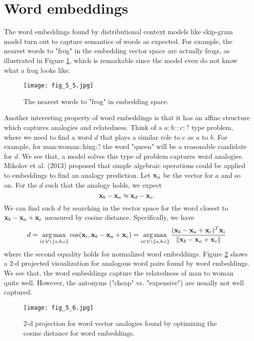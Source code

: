 \documentclass[../book-template.tex]{subfiles}
\begin{document}
\section{Word embeddings}
The word embeddings found by distributional context models like skip-gram model turn out to capture semantics of words as expected. For example, the nearest words to "frog" in the embedding vector space are actually frogs, as illustrated in Figure \ref{fig_5_5}, which is remarkable since the model even do not know what a frog looks like.
\begin{figure}[h] 
	\centering 
	\texttt{[image: fig\_5\_5.jpg]} 
	\caption{The nearest words to "frog" in embedding space.}\label{fig_5_5}
\end{figure}
\par Another interesting property of word embeddings is that it has an affine structure which captures analogies and relatedness. Think of a $a:b::c:?$ type problem, where we need to find a word $d$ that plays a similar role to $c$ as $a$ to $b$. For example, for man:woman::king:? the word "queen" will be a reasonable candidate for $d$. We see that, a model solves this type of problem captures word analogies. Mikolov et al. (2013) proposed that simple algebraic operations could be applied to embeddings to find an analogy prediction. Let ${\bf x}_a$ be the vector for $a$ and so on. For the $d$ such that the analogy holds, we expect
\begin{equation*}
	{\bf x}_b - {\bf x}_a \approx {\bf x}_d-{\bf x}_c.
\end{equation*}
We can find such $d$ by searching in the vector space for the word closest to ${\bf x}_b-{\bf x}_a+{\bf x}_c$ measured by cosine distance. Specifically, we have
\begin{equation*}
	d= \mathop{\arg\max}_{i\in \mathcal{V}\backslash\{a,b,c\}} \cos({\bf x}_i, {\bf x}_b-{\bf x}_a+{\bf x}_c) =\mathop{\arg\max}_{i\in \mathcal{V}\backslash\{a,b,c\}}\frac{({\bf x}_b-{\bf x}_a+{\bf x}_c)^T{\bf x}_i}{\|{\bf x}_b-{\bf x}_a+{\bf x}_c\|}
\end{equation*}
where the second equality holds for normalized word embeddings. Figure \ref{fig_5_6} shows a 2-d projected visualization for analogous word pairs found by word embeddings. We see that, the word embeddings capture the relatedness of man to woman quite well. However, the antonyms ("cheap" vs. "expensive") are usually not well captured.
\begin{figure}[h] 
	\centering 
	\texttt{[image: fig\_5\_6.jpg]} 
	\caption{2-d projection for word vector analogies found by optimizing the cosine distance for word embeddings.}\label{fig_5_6}
\end{figure}
\end{document}
